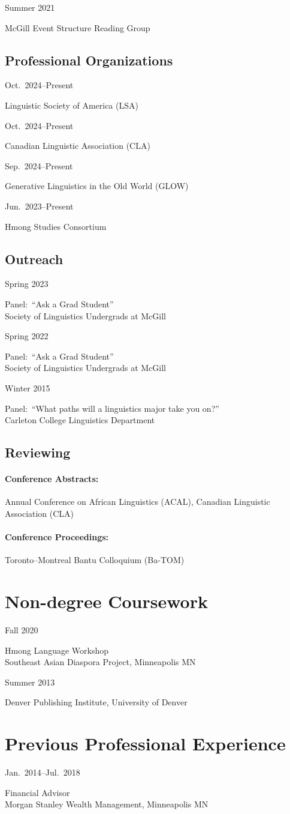 \documentclass[11pt,oneside,DIV=8,parskip=off,letterpaper]{scrarticle} %
\newlength{\leftcolwidth}
\newlength{\mycolspace}
\newlength{\rightcolwidth}
\newlength{\spacingbefore}
\newlength{\spacingafter}
\newcommand{\mytwocol}[2]{%
	\vspace{\spacingbefore}%
	\begin{minipage}[t]{\leftcolwidth}%
		\strut#1%
	\end{minipage}%
	\hspace{\mycolspace}%
	\begin{minipage}[t]{\rightcolwidth}%
		\strut#2%
	\end{minipage}%
	\vspace{\spacingafter}\par%
	}
\newcommand{\cvline}[2]{%
	\mytwocol{#1}{#2}%
	}
\begin{document}
\cvline{Summer 2021}{McGill Event Structure Reading Group}

\subsection{Professional Organizations}
\cvline{Oct.\ 2024--Present}{Linguistic Society of America (LSA)}
\cvline{Oct.\ 2024--Present}{Canadian Linguistic Association (CLA)}
\cvline{Sep.\ 2024--Present}{Generative Linguistics in the Old World (GLOW)}
\cvline{Jun.\ 2023--Present}{Hmong Studies Consortium}

\subsection{Outreach}
\cvline{Spring 2023}{Panel:\ ``Ask a Grad Student''\\Society of Linguistics Undergrads at McGill}

\cvline{Spring 2022}{Panel:\ ``Ask a Grad Student''\\Society of Linguistics Undergrads at McGill}

\cvline{Winter 2015}{Panel:\ ``What paths will a linguistics major take you on?''\\Carleton College Linguistics Department}

\subsection{Reviewing}

\paragraph{Conference Abstracts:} Annual Conference on African Linguistics (ACAL), Canadian Linguistic Association (CLA)

\paragraph{Conference Proceedings:} Toronto--Montreal Bantu Colloquium (Ba-TOM)

\section{Non-degree Coursework}
\cvline{Fall 2020}{Hmong Language Workshop\\Southeast Asian Diaspora Project, Minneapolis MN}
\cvline{Summer 2013}{Denver Publishing Institute, University of Denver}

\section{Previous Professional Experience}
\cvline{Jan.\ 2014--Jul.\ 2018}{Financial Advisor\\Morgan Stanley Wealth Management, Minneapolis MN}

\end{document}
